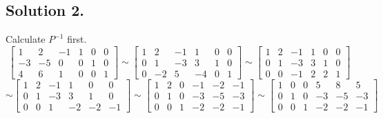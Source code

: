 \documentclass{article}
\begin{document}
\subsection*{Solution 2.}
Calculate $P^{-1}$ first.
\[\left[\begin{array}{rrrrrr}
1 & 2 &-1&1&0&0 \\
-3 & -5 & 0&0&1&0 \\
4 & 6 & 1&0&0&1
\end{array}\right]
\sim 
\left[\begin{array}{rrrrrr}
1 & 2 &-1&1&0&0 \\
0 & 1 & -3&3&1&0 \\
0 & -2 & 5&-4&0&1
\end{array}\right]
\sim 
\left[\begin{array}{rrrrrr}
1 & 2 &-1&1&0&0 \\
0 & 1 & -3&3&1&0 \\
0 & 0 & -1&2&2&1
\end{array}\right]
\]
\[
\sim 
\left[\begin{array}{rrrrrr}
1 & 2 &-1&1&0&0 \\
0 & 1 & -3&3&1&0 \\
0 & 0 & 1&-2&-2&-1
\end{array}\right]
\sim 
\left[\begin{array}{rrrrrr}
1 & 2 &0&-1&-2&-1 \\
0 & 1 & 0&-3&-5&-3 \\
0 & 0 & 1&-2&-2&-1
\end{array}\right]
\sim 
\left[\begin{array}{rrrrrr}
1 & 0 &0&5&8&5 \\
0 & 1 & 0&-3&-5&-3 \\
0 & 0 & 1&-2&-2&-1
\end{array}\right]
\]
\end{document}
